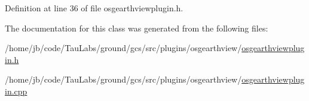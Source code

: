 \-Definition at line 36 of file osgearthviewplugin.\-h.



\-The documentation for this class was generated from the following files\-:\begin{DoxyCompactItemize}
\item 
/home/jb/code/\-Tau\-Labs/ground/gcs/src/plugins/osgearthview/\hyperlink{osgearthviewplugin_8h}{osgearthviewplugin.\-h}\item 
/home/jb/code/\-Tau\-Labs/ground/gcs/src/plugins/osgearthview/\hyperlink{osgearthviewplugin_8cpp}{osgearthviewplugin.\-cpp}\end{DoxyCompactItemize}
